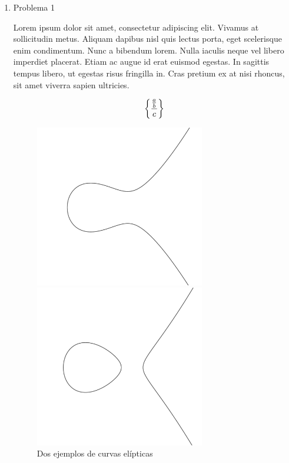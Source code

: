 \documentclass[spanish,mexico]{article}
\numberwithin{equation}{section}
\theoremstyle{definition}
\theoremstyle{remark}
\DeclarePairedDelimiter{\set}{\{}{\}}
\begin{document}
\begin{enumerate}[wide]

\item Problema 1

    Lorem ipsum dolor sit amet, consectetur adipiscing elit. Vivamus at sollicitudin metus. Aliquam dapibus nisl quis lectus porta, eget scelerisque enim condimentum. Nunc a bibendum lorem. Nulla iaculis neque vel libero imperdiet placerat. Etiam ac augue id erat euismod egestas. In sagittis tempus libero, ut egestas risus fringilla in. Cras pretium ex at nisi rhoncus, sit amet viverra sapien ultricies. 
    
    \[
        \set*{\frac{\frac{a}{b}}{c}}
    \]
    
    \begin{figure}[h]
    \centering
    \begin{minipage}{.5\textwidth}
        \centering
        \includegraphics[width=0.7\textwidth]{imgs/1.pdf}
        \caption*{$E_1:y^2=x^3-3x+5$}
    \end{minipage}%
    \begin{minipage}{.5\textwidth}
        \centering
        \includegraphics[width=0.7\textwidth]{imgs/2.pdf}
        \caption*{$E_2:y^2=x^3-5x+3$}
    \end{minipage}
    \caption{Dos ejemplos de curvas elípticas}
    \label{fig:elip2examples}
    \end{figure}
    

\end{enumerate}
\end{document}
